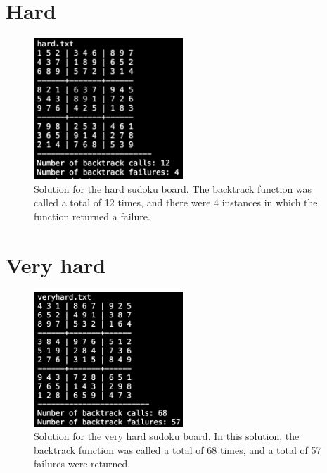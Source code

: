 \documentclass{article}
\begin{document}
    \section*{Hard}

    \begin{figure}[H]
        \centering
        \includegraphics[width=0.5\textwidth]{Images/hard.png}
        \caption[Hard solution]{Solution for the hard sudoku board. The backtrack function was called a total of 12 times, and there were 4 instances in which the function returned a failure.}
        \label{fig:Hard solution}
    \end{figure}

    \section*{Very hard}

    \begin{figure}[H]
        \centering
        \includegraphics[width=0.5\textwidth]{Images/very_hard.png}
        \caption[Very hard solution]{Solution for the very hard sudoku board. In this solution, the backtrack function was called a total of 68 times, and a total of 57 failures were returned.}
        \label{fig:Very hard solution}
    \end{figure}
\end{document}
